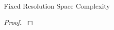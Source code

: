 \begin{theorem}{Fixed Resolution Space Complexity}
\label{thm:fixed-resolution-algo-space-complexity}

\end{theorem}

\begin{proof}
\label{prf:fixed-resolution-algo-space-complexity}

\end{proof}
